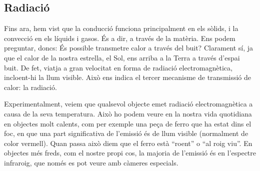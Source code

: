 \documentclass[12pt]{book}
\begin{document}
\subsection{Radiació}

Fins ara, hem vist que la conducció funciona principalment en els sòlids, i la convecció en els líquids i gasos. És a dir, a través de la matèria. Ens podem preguntar, doncs: És possible transmetre calor a través del buit? Clarament sí, ja que el calor de la nostra estrella, el Sol, ens arriba a la Terra a través d'espai buit. De fet, viatja a gran velocitat en forma de radiació electromagnètica, incloent-hi la llum visible. Això ens indica el tercer mecanisme de transmissió de calor: la radiació. 

Experimentalment, veiem que qualsevol objecte emet radiació electromagnètica a causa de la seva temperatura. Això ho podem veure en la nostra vida quotidiana en objectes molt calents, com per exemple una peça de ferro que ha estat dins el foc, en que una part significativa de l'emissió és de llum visible (normalment de color vermell). Quan passa això diem que el ferro està ``roent'' o ``al roig viu''. En objectes més freds, com el nostre propi cos, la majoria de l'emissió és en l'espectre infraroig, que només es pot veure amb càmeres especials.
\end{document}
